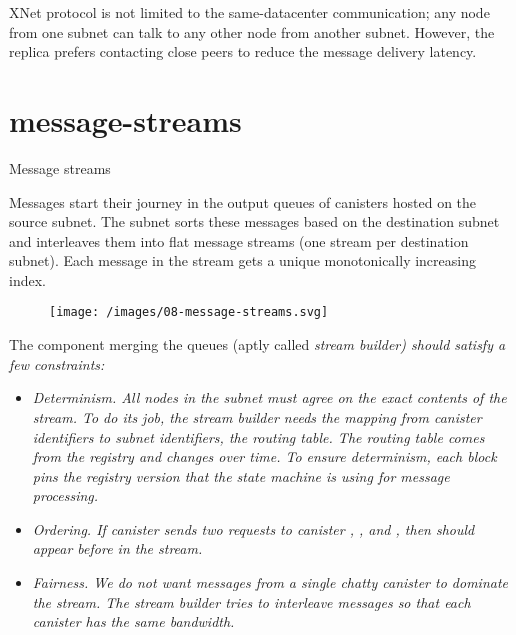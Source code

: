 \documentclass{article}
\begin{document}
XNet protocol is not limited to the same-datacenter communication; any node from one subnet can talk to any other node from another subnet.
However, the replica prefers contacting close peers to reduce the message delivery latency.

\section{message-streams}{Message streams}

Messages start their journey in the output queues of canisters hosted on the source subnet.
The subnet sorts these messages based on the destination subnet and interleaves them into flat message streams (one stream per destination subnet).
Each message in the stream gets a unique monotonically increasing index.

\begin{figure}[grayscale-diagram]
  \texttt{[image: /images/08-message-streams.svg]}
\end{figure}

The component merging the queues (aptly called \em{stream builder}) should satisfy a few constraints:
\begin{itemize}
  \item
  \em{Determinism}.
  All nodes in the subnet must agree on the exact contents of the stream.
  To do its job, the stream builder needs the mapping from canister identifiers to subnet identifiers, the \em{routing table}.
  The routing table comes from the registry and changes over time.
  To ensure determinism, each block pins the registry version that the state machine is using for message processing.
  \item
  \em{Ordering}.
  If canister  sends two requests to canister , , and , then  should appear before  in the stream.
  \item
  \em{Fairness.}
  We do not want messages from a single chatty canister to dominate the stream.
  The stream builder tries to interleave messages so that each canister has the same bandwidth.
\end{itemize}
\end{document}
